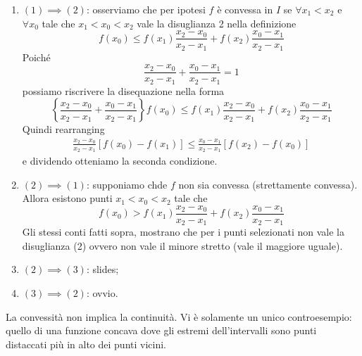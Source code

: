 \documentclass[a4paper]{article}
\begin{document}
\begin{snippetproof}{}
    \begin{enumerate}
        \item \((1) \implies (2)\):
            osserviamo che per ipotesi \(f\) è convessa in \(I\)
            se \(\forall x_1 < x_2\) e \(\forall x_0\) tale che
            \(x_1 < x_0 < x_2\) vale la disuglianza 2 nella definizione
            \[
                f(x_0) \leq f(x_1) \frac{x_2 - x_0}{x_2 - x_1} + f(x_2) \frac{x_0 - x_1}{x_2 - x_1}
            \]
            Poiché
            \[
                \frac{x_2 - x_0}{x_2 - x_1} + \frac{x_0-x_1}{x_2 - x_1} = 1
            \]
            possiamo riscrivere la disequazione nella forma
            \[
                \left\{
                    \frac{x_2 - x_0}{x_2 - x_1} + \frac{x_0-x_1}{x_2 - x_1}
                \right\}
                f(x_0)
                \leq
                f(x_1) \frac{x_2 - x_0}{x_2 - x_1} + f(x_2) \frac{x_0 - x_1}{x_2 - x_1}
            \]
            Quindi rearranging
            \begin{align*}
                \frac{x_2 - x_0}{x_2 - x_1}[f(x_0) - f(x_1)]
                \leq \frac{x_0 - x_1}{x_2 - x_1}[f(x_2) - f(x_0)]
            \end{align*}
            e dividendo otteniamo la seconda condizione.
        \item \((2) \implies (1)\): supponiamo chde \(f\)
        non sia convessa (strettamente convessa).
        Allora esistono punti \(x_1 < x_0 < x_2\) tale che
        \[
            f(x_0) > f(x_1) \frac{x_2 - x_0}{x_2 - x_1} + f(x_2)\frac{x_0 - x_1}{x_2 - x_1}
        \]
        Gli stessi conti fatti sopra, mostrano che per i punti selezionati
        non vale la disuglianza (2) ovvero non vale il minore stretto (vale il maggiore uguale).
        \item \((2) \implies (3)\): slides;
        \item \((3) \implies (2)\): ovvio.
    \end{enumerate}
\end{snippetproof}

La convessità non implica la continuità. Vi è solamente un unico controesempio:
quello di una funzione concava dove gli estremi dell'intervalli sono punti distaccati più in alto dei punti vicini.
\end{document}

